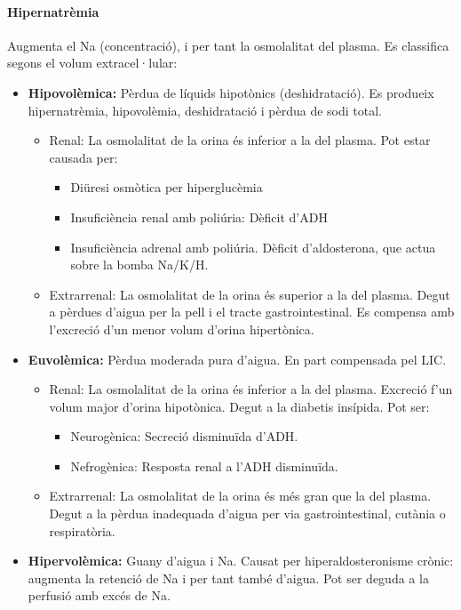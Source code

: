 \paragraph{Hipernatrèmia}
Augmenta el Na (concentració), i per tant la osmolalitat del plasma. Es classifica
segons el volum extracel·lular:
\begin{itemize}
\item \textbf{Hipovolèmica:} Pèrdua de líquids hipotònics (deshidratació). Es
  produeix hipernatrèmia, hipovolèmia, deshidratació i pèrdua de sodi
  total.

  \begin{itemize}
  \item Renal: La osmolalitat de la orina és inferior a la del
    plasma. Pot estar causada per:
    \begin{itemize}
    \item Diüresi osmòtica per hiperglucèmia
    \item Insuficiència renal amb poliúria: Dèficit d'ADH
    \item Insuficiència adrenal amb poliúria. Dèficit d'aldosterona,
      que actua sobre la bomba Na/K/H.
    \end{itemize}

  \item Extrarrenal: La osmolalitat de la orina és superior a la del
    plasma. Degut a pèrdues d'aigua per la pell i el tracte
    gastrointestinal. Es compensa amb l'excreció d'un menor volum
    d'orina hipertònica.
  \end{itemize}

\item \textbf{Euvolèmica:} Pèrdua moderada pura d'aigua. En part
  compensada pel LIC.
  \begin{itemize}
  \item Renal: La osmolalitat de la orina és inferior a la del
    plasma. Excreció f'un volum major d'orina hipotònica. Degut a la
    diabetis insípida. Pot ser:
    \begin{itemize}
    \item Neurogènica: Secreció disminuïda d'ADH.
    \item Nefrogènica: Resposta renal a l'ADH disminuïda.
    \end{itemize}
  \item Extrarrenal: La osmolalitat de la orina és més gran que la del
    plasma. Degut a la pèrdua inadequada d'aigua per via
    gastrointestinal, cutània o respiratòria.
  \end{itemize}

\item \textbf{Hipervolèmica:} Guany d'aigua i Na. Causat per
  hiperaldosteronisme crònic: augmenta la retenció de Na i per tant
  també d'aigua. Pot ser deguda a la perfusió amb excés de Na.
\end{itemize}

